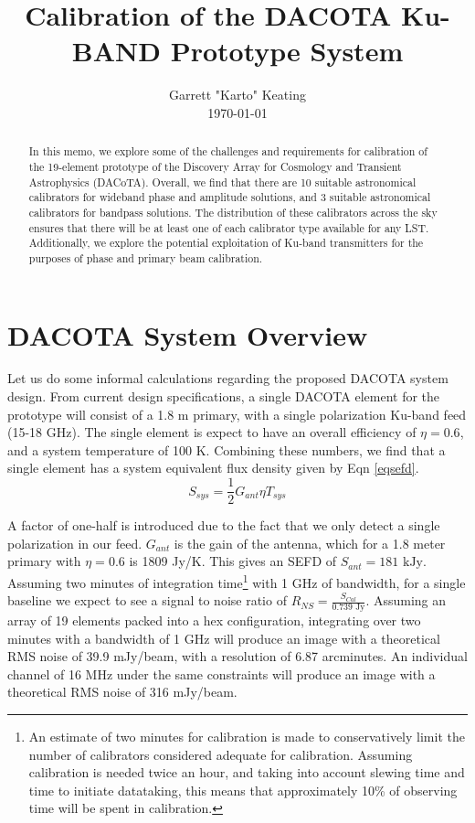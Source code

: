 \documentclass[preprint]{aastex}
\begin{document}
\title{Calibration of the DACOTA Ku-BAND Prototype System}
\author{Garrett "Karto" Keating \\ \today}

\begin{abstract} In this memo, we explore some of the challenges and requirements for calibration of the 19-element prototype of the Discovery Array for Cosmology and Transient Astrophysics (DACoTA). Overall, we find that there are 10 suitable astronomical calibrators for wideband phase and amplitude solutions, and 3 suitable astronomical calibrators for bandpass solutions. The distribution of these calibrators across the sky ensures that there will be at least one of each calibrator type available for any LST. Additionally, we explore the potential exploitation of Ku-band transmitters for the purposes of phase and primary beam calibration.
\end{abstract}

\section{DACOTA System Overview}\label{secoverview}
Let us do some informal calculations regarding the proposed DACOTA system design. From current design specifications, a single DACOTA element for the prototype will consist of a 1.8 m primary, with a single polarization Ku-band feed (15-18 GHz). The single element is expect to have an overall efficiency of $\eta=0.6$, and a system temperature of 100 K. Combining these numbers, we find that a single element has a system equivalent flux density given by Eqn \ref{eqsefd}.
\begin{equation} \label{eqsefd}
S_{sys}=\frac{1}{2}G_{ant}{\eta}T_{sys}
\end{equation}

\noindent A factor of one-half is introduced due to the fact that we only detect a single polarization in our feed. $G_{ant}$ is the gain of the antenna, which for a 1.8 meter primary with $\eta=0.6$ is 1809 Jy/K. This gives an SEFD of $S_{ant}=181\text{ kJy}$. Assuming two minutes of integration time\footnote{An estimate of two minutes for calibration is made to conservatively limit the number of calibrators considered adequate for calibration. Assuming calibration is needed twice an hour, and taking into account slewing time and time to initiate datataking, this means that approximately 10\% of observing time will be spent in calibration.} with 1 GHz of bandwidth, for a single baseline we expect to see a signal to noise ratio of $R_{NS}=\frac{S_{Cal}}{0.739\text{ Jy}}$. Assuming an array of 19 elements packed into a hex configuration, integrating over two minutes with a bandwidth of 1 GHz will produce an image with a theoretical RMS noise of 39.9 mJy/beam, with a resolution of 6.87 arcminutes. An individual channel of 16 MHz under the same constraints will produce an image with a theoretical RMS noise of 316 mJy/beam. 
\end{document}
